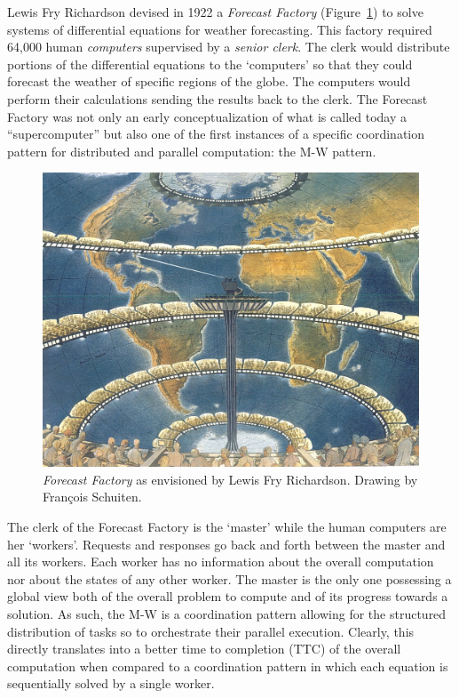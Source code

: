 \documentclass{sig-alternate}
\begin{document}
Lewis Fry Richardson devised in 1922 a \textit{Forecast Factory}
(Figure~\ref{fig:figures_forecast-factory}) to solve systems of differential
equations for weather forecasting. This factory required 64,000 human
\textit{computers} supervised by a \textit{senior clerk}. The clerk would
distribute portions of the differential equations to the `computers' so that
they could forecast the weather of specific regions of the globe. The computers
would perform their calculations sending the results back to the clerk. The
Forecast Factory was not only an early conceptualization of what is called
today a ``supercomputer'' but also one of the first instances of a specific
coordination pattern for distributed and parallel computation: the M-W pattern.

\begin{figure}[t]
  \centering
    \includegraphics[width=.45\textwidth]{figures/forecast-factory.jpg}
  \caption{\textit{Forecast Factory} as envisioned by Lewis Fry Richardson.
    Drawing by Fran{\c c}ois Schuiten.}
  \label{fig:figures_forecast-factory}
\end{figure}

The clerk of the Forecast Factory is the `master' while the human computers are
her `workers'. Requests and responses go back and forth between the master and
all its workers. Each worker has no information about the overall computation
nor about the states of any other worker. The master is the only one possessing
a global view both of the overall problem to compute and of its progress
towards a solution. As such, the M-W is a coordination pattern allowing for the
structured distribution of tasks so to orchestrate their parallel execution.
Clearly, this directly translates into a better time to completion (TTC) of the
overall computation when compared to a coordination pattern in which each
equation is sequentially solved by a single worker.

\end{document}
